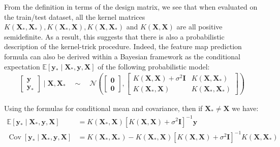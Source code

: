 \documentclass[11pt]{article}
\theoremstyle{plain} %
\theoremstyle{remark}
\begin{document}
From the definition in terms of the design matrix, we see that when evaluated on the train/test dataset, all the kernel matrices
$K\left(\mathbf{X}_{*}, \mathbf{X}_{*}\right), K\left(\mathbf{X}_{*},
  \mathbf{X}\right), K\left(\mathbf{X}, \mathbf{X}_{*}\right)$ and $K(\mathbf{X},
  \mathbf{X})$ are all positive semidefinite. As a result, this suggests that
there is also a probabilistic description of the kernel-trick procedure. Indeed,
the feature map prediction formula can also be derived within a Bayesian
framework as the conditional expectation $\mathbb{E}\left[\mathbf{y}_{*} \mid
    \mathbf{X}_{*}, \mathbf{y}, \mathbf{X}\right]$ of the following probabilistic
model:
\begin{align}
  \begin{bmatrix}
    \mathbf{y} \\
    \mathbf{y}_{*}
  \end{bmatrix} \mid \mathbf{X}, \mathbf{X}_{*}
  \quad \sim \quad
  \mathcal{N}\left(\begin{bmatrix}
                       \boldsymbol{0} \\
                       \boldsymbol{0}
                     \end{bmatrix},
  \begin{bmatrix}
      K(\mathbf{X}, \mathbf{X})+\sigma^{2} \mathbf{I} & K\left(\mathbf{X}, \mathbf{X}_{*}\right)     \\
      K\left(\mathbf{X}_{*}, \mathbf{X}\right)        & K\left(\mathbf{X}_{*}, \mathbf{X}_{*}\right)
    \end{bmatrix}\right)
  \label{eq:kernel as Gaussian Field}
\end{align}

Using the formulas for conditional mean and covariance, then if $\mathbf{X}_{*}
  \neq \mathbf{X}$ we have:
\begin{equation}
  \begin{aligned}
    \mathbb{E}\left[\mathbf{y}_{*} \mid \mathbf{X}_{*}, \mathbf{y}, \mathbf{X}\right]         & =K\left(\mathbf{X}_{*}, \mathbf{X}\right)\left[K(\mathbf{X}, \mathbf{X})+\sigma^{2} \mathbf{I}\right]^{-1} \mathbf{y}                                                                             \\
    \operatorname{Cov}\left[\mathbf{y}_{*} \mid \mathbf{X}_{*}, \mathbf{y}, \mathbf{X}\right] & =K\left(\mathbf{X}_{*}, \mathbf{X}_{*}\right) -K\left(\mathbf{X}_{*}, \mathbf{X}\right)\left[K(\mathbf{X}, \mathbf{X})+\sigma^{2} \mathbf{I}\right]^{-1} K\left(\mathbf{X}, \mathbf{X}_{*}\right)
  \end{aligned}
  \label{eq: posterior predictive distribution}
\end{equation}
\end{document}

